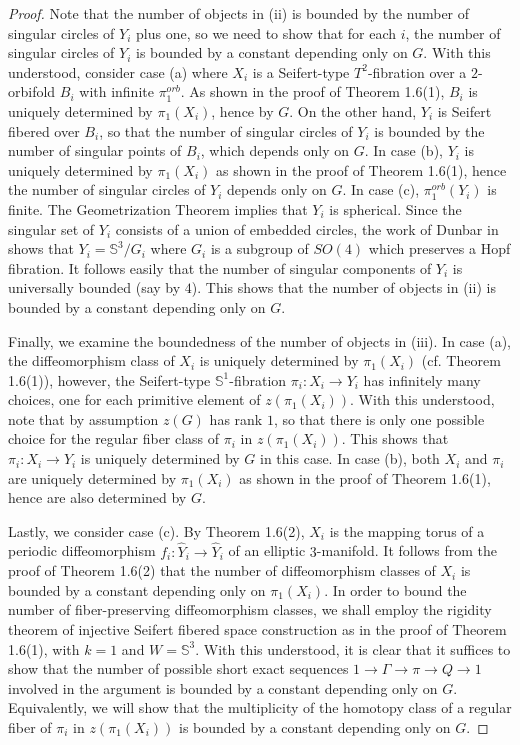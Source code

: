 \documentclass[11pt]{amsart}
\theoremstyle{plain}
\numberwithin{theorem}{section}
\theoremstyle{definition}
\begin{document}
\begin{proof}
Note that the number of objects in (ii) is bounded by the number of singular circles of
$Y_i$ plus one, so we need to show that for each $i$, the number of singular circles of
$Y_i$ is bounded by a constant depending only on $G$. With this understood, consider 
case (a) where $X_i$ is a Seifert-type $T^2$-fibration over a $2$-orbifold $B_i$ with infinite 
$\pi_1^{orb}$. As shown in the proof of Theorem 1.6(1), $B_i$ is uniquely determined by 
$\pi_1(X_i)$,  hence by $G$. On the other hand, $Y_i$ is Seifert fibered over $B_i$, 
so that the number of singular circles of $Y_i$ is bounded by the number of singular 
points of $B_i$, which depends only on $G$. In case (b), $Y_i$ is uniquely determined by 
$\pi_1(X_i)$ as shown in the proof of 
Theorem 1.6(1), hence the number of singular circles of $Y_i$ depends only on $G$.
In case (c),  $\pi_1^{orb}(Y_i)$ is finite. The Geometrization Theorem implies that $Y_i$ is 
spherical. Since the singular set of $Y_i$ consists of a union of embedded circles, 
the work of Dunbar in \cite{Dun} shows that $Y_i={{\mathbb S}}^3/G_i$ where $G_i$ is a subgroup of
$SO(4)$ which preserves a Hopf fibration. It follows easily that the number of singular 
components of $Y_i$ is universally bounded (say by $4$). This shows that the number of 
objects in (ii) is bounded by a constant depending only on $G$. 

Finally, we examine the boundedness of the number of objects in (iii). In case (a), the 
diffeomorphism class of $X_i$ is uniquely determined by $\pi_1(X_i)$ (cf. Theorem 1.6(1)),
however, the Seifert-type ${{\mathbb S}}^1$-fibration $\pi_i: X_i\rightarrow Y_i$ has infinitely many choices, one 
for each primitive element of $z(\pi_1(X_i))$. With this understood, note that by assumption
$z(G)$ has rank $1$, so that there is only one possible choice for the regular fiber class of 
$\pi_i$ in $z(\pi_1(X_i))$. This shows that $\pi_i:X_i\rightarrow Y_i$ is uniquely determined by 
$G$ in this case. In case (b), both $X_i$ and $\pi_i$ are uniquely determined by $\pi_1(X_i)$ 
as shown in the proof of Theorem 1.6(1), hence are also determined by $G$.  

Lastly, we consider case (c). By Theorem 1.6(2), $X_i$ is the mapping torus of a periodic 
diffeomorphism $f_i:\hat{Y}_i\rightarrow \hat{Y}_i$ of an elliptic $3$-manifold. 
It follows from the proof of Theorem 1.6(2) that the number of diffeomorphism 
classes of $X_i$ is bounded by a constant depending only on $\pi_1(X_i)$. In order to 
bound the number of fiber-preserving diffeomorphism classes, we shall employ the rigidity
theorem of injective Seifert fibered space construction as in the proof of Theorem 1.6(1),
with $k=1$ and $W={{\mathbb S}}^3$. With this understood, it is clear that it suffices to show that the
number of possible short exact sequences 
$1\rightarrow \Gamma\rightarrow \pi\rightarrow Q\rightarrow 1$ involved in the argument 
is bounded by a constant depending only on $G$. Equivalently, we will show that the 
multiplicity of the homotopy class of a regular fiber of $\pi_i$ in $z(\pi_1(X_i))$ is bounded 
by a constant depending only on $G$.


\end{proof}
\end{document}

